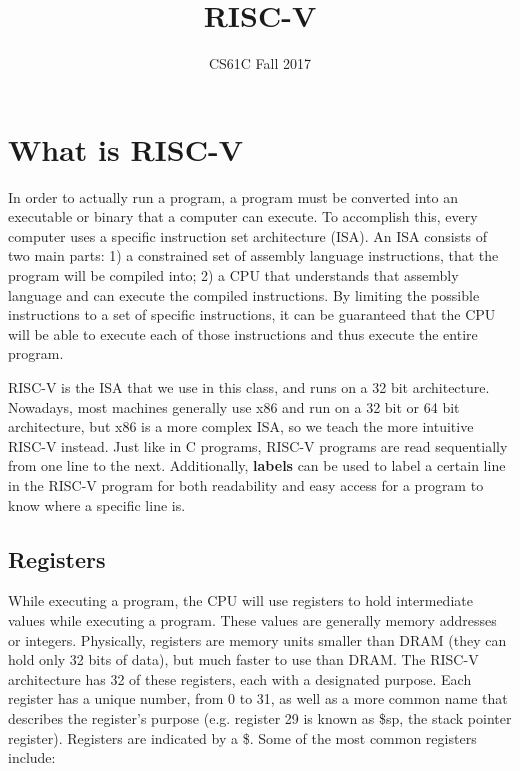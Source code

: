\documentclass{article}
\title{RISC-V}
\author{CS61C Fall 2017}
\date{ }
\begin{document}
\maketitle
\tableofcontents

\section{What is RISC-V}
In order to actually run a program, a program must be converted into an executable or binary that a computer can execute. To accomplish this, every computer uses a specific instruction set architecture (ISA). An ISA consists of two main parts: 1) a constrained set of assembly language instructions, that the program will be compiled into; 2) a CPU that understands that assembly language and can execute the compiled instructions. By limiting the possible instructions to a set of specific instructions, it can be guaranteed that the CPU will be able to execute each of those instructions and thus execute the entire program.

RISC-V is the ISA that we use in this class, and runs on a 32 bit architecture. Nowadays, most machines generally use x86 and run on a 32 bit or 64 bit architecture, but x86 is a more complex ISA, so we teach the more intuitive RISC-V instead. Just like in C programs, RISC-V programs are read sequentially from one line to the next.  Additionally, \textbf{labels} can be used to label a certain line in the RISC-V program for both readability and easy access for a program to know where a specific line is.

\subsection{Registers}
While executing a program, the CPU will use registers to hold intermediate values while executing a program. These values are generally memory addresses or integers. Physically, registers are memory units smaller than DRAM (they can hold only 32 bits of data), but much faster to use than DRAM. The RISC-V architecture has 32 of these registers, each with a designated purpose. Each register has a unique number, from 0 to 31, as well as a more common name that describes the register's purpose (e.g. register 29 is known as \$sp, the stack pointer register). Registers are indicated by a \$. Some of the most common registers include: 
\end{document}
